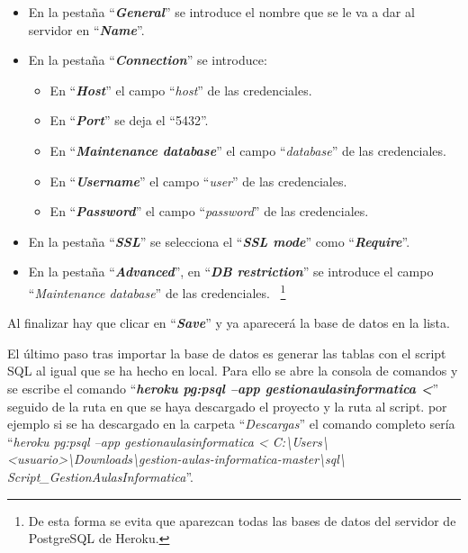 \begin{itemize}
    \item En la pestaña ``\textbf{\textit{General}}'' se introduce el nombre que se le va a dar al servidor en ``\textbf{\textit{Name}}''.
    
    \item En la pestaña ``\textbf{\textit{Connection}}'' se introduce:
        \begin{itemize}
            \item En ``\textbf{\textit{Host}}'' el campo ``\textit{host}'' de las credenciales.
            
            \item En ``\textbf{\textit{Port}}'' se deja el ``5432''.
            
            \item En ``\textbf{\textit{Maintenance database}}'' el campo ``\textit{database}'' de las credenciales.
            
            \item En ``\textbf{\textit{Username}}'' el campo ``\textit{user}'' de las credenciales.
            
            \item En ``\textbf{\textit{Password}}'' el campo ``\textit{password}'' de las credenciales.
        \end{itemize}
        
    \item En la pestaña ``\textbf{\textit{SSL}}'' se selecciona el ``\textbf{\textit{SSL mode}}'' como ``\textbf{\textit{Require}}''.
    
    \item En la pestaña ``\textbf{\textit{Advanced}}'', en ``\textbf{\textit{DB restriction}}'' se introduce el campo ``\textit{Maintenance database}'' de las credenciales. ~\footnote{De esta forma se evita que aparezcan todas las bases de datos del servidor de PostgreSQL de Heroku.}
\end{itemize}

Al finalizar hay que clicar en ``\textbf{\textit{Save}}'' y ya aparecerá la base de datos en la lista.

El último paso tras importar la base de datos es generar las tablas con el script SQL al igual que se ha hecho en local. Para ello se abre la consola de comandos y se escribe el comando ``\textbf{\textit{heroku pg:psql --app gestionaulasinformatica <}}'' seguido de la ruta en que se haya descargado el proyecto y la ruta al script. por ejemplo si se ha descargado en la carpeta ``\textit{Descargas}'' el comando completo sería ``\textit{heroku pg:psql --app gestionaulasinformatica < C:\textbackslash{}Users\textbackslash{}<usuario>\textbackslash{}Downloads\textbackslash{}gestion-aulas-informatica-master\textbackslash{}sql\textbackslash{} Script\_GestionAulasInformatica}''.

